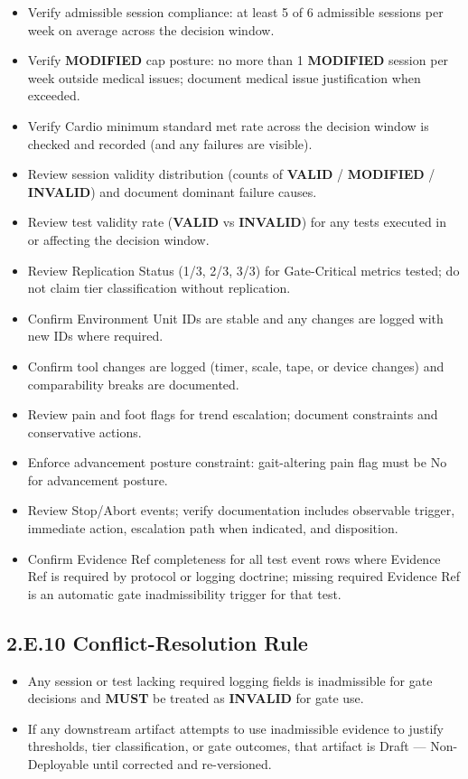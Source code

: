 \documentclass[10pt]{article}
\begin{document}
\begin{itemize}
\item Verify admissible session compliance: at least 5 of 6 admissible sessions per week on average across the decision window.
\item Verify \textbf{MODIFIED} cap posture: no more than 1 \textbf{MODIFIED} session per week outside medical issues; document medical issue justification when exceeded.
\item Verify Cardio minimum standard met rate across the decision window is checked and recorded (and any failures are visible).
\item Review session validity distribution (counts of \textbf{VALID} / \textbf{MODIFIED} / \textbf{INVALID}) and document dominant failure causes.
\item Review test validity rate (\textbf{VALID} vs \textbf{INVALID}) for any tests executed in or affecting the decision window.
\item Review Replication Status (1/3, 2/3, 3/3) for Gate-Critical metrics tested; do not claim tier classification without replication.
\item Confirm Environment Unit IDs are stable and any changes are logged with new IDs where required.
\item Confirm tool changes are logged (timer, scale, tape, or device changes) and comparability breaks are documented.
\item Review pain and foot flags for trend escalation; document constraints and conservative actions.
\item Enforce advancement posture constraint: gait-altering pain flag must be No for advancement posture.
\item Review Stop/Abort events; verify documentation includes observable trigger, immediate action, escalation path when indicated, and disposition.
\item Confirm Evidence Ref completeness for all test event rows where Evidence Ref is required by protocol or logging doctrine; missing required Evidence Ref is an automatic gate inadmissibility trigger for that test.
\end{itemize}

\subsection*{2.E.10 Conflict-Resolution Rule}
{}

\begin{itemize}
\item Any session or test lacking required logging fields is inadmissible for gate decisions and \textbf{MUST} be treated as \textbf{INVALID} for gate use.
\item If any downstream artifact attempts to use inadmissible evidence to justify thresholds, tier classification, or gate outcomes, that artifact is Draft — Non-Deployable until corrected and re-versioned.
\end{itemize}
\end{document}
